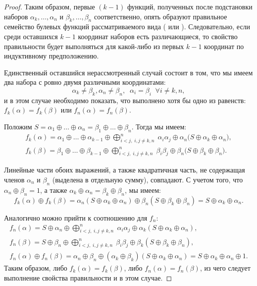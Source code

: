 \begin{proof}
        Таким образом, первые $(k-1)$ функций, полученных после подстановки наборов $\alpha_k, \ldots, \alpha_n$ и $\beta_k, \ldots, \beta_n$ соответственно, опять образуют правильное семейство булевых функций рассматриваемого вида ( или ).
        Следовательно, если среди оставшихся $k-1$ координат наборов есть различающиеся, то свойство правильности будет выполняться для какой-либо из первых $k-1$ координат по индуктивному предположению.

        Единственный оставшийся нерассмотренный случай состоит в том, что мы имеем два набора с ровно двумя различными координатами:
        \[
            \alpha_k \ne \beta_k, \alpha_n \ne \beta_n, \; \; \alpha_i = \beta_i \; \; \forall i \ne k, n,
        \]
        и в этом случае необходимо показать, что выполнено хотя бы одно из равенств: 
        $f_k(\alpha) = f_k(\beta)$ или $f_n(\alpha) = f_n(\beta)$. 


        Положим $S = \alpha_1 \oplus \ldots \oplus \alpha_{n} = \beta_1 \oplus \ldots \oplus \beta_{n}$.
        Тогда мы имеем:
        \begin{gather*}
            f_k(\alpha) = \alpha_1 \oplus \ldots \oplus \alpha_{k-1}
            \oplus \bigoplus_{i < j, \; i, j \ne k, n}^n \; \alpha_i \alpha_j
            \oplus \alpha_n \Big(S \oplus \alpha_k \oplus \alpha_n \Big), \\
            f_k(\beta) = \beta_1 \oplus \ldots \oplus \beta_{k-1}
            \oplus \bigoplus_{i < j, \; i, j \ne k, n}^n \; \beta_i \beta_j
            \oplus \beta_n \Big(S \oplus \beta_k \oplus \beta_n \Big).
        \end{gather*}

        Линейные части обоих выражений, а также квадратичная часть, не содержащая членов $\alpha_n$ и $\beta_n$ (выделена в отдельную сумму), совпадают.
        С учетом того, что $\alpha_n \oplus \beta_n = 1$, а также $ \alpha_k \oplus \alpha_n = \beta_k \oplus \beta_n $, 
        мы имеем: 
        \[
            f_k(\alpha) \oplus f_k(\beta) = 
            \alpha_n (S \oplus \alpha_k \oplus \alpha_n) \oplus
            \beta_n(S \oplus \beta_k \oplus \beta_n)  = S \oplus \alpha_k \oplus \alpha_n.
        \]

        Аналогично можно прийти к соотношению для $f_n$:
        \begin{gather*}
            f_n(\alpha) = S \oplus \alpha_n \oplus \bigoplus_{i < j, \; i, j \ne k, n}^n \; \alpha_i \alpha_j \oplus \alpha_k (S \oplus \alpha_k \oplus \alpha_n), \\
            f_n(\beta) = S \oplus \beta_n \oplus \bigoplus_{i < j, \; i, j \ne k, n}^n \; \beta_i \beta_j \oplus \beta_k (S \oplus \beta_k \oplus \beta_n), \\
            f_n(\alpha) \oplus f_n(\beta) = \alpha_n \oplus \beta_n \oplus (\alpha_k \oplus \beta_k) (S \oplus \alpha_k \oplus \alpha_n) = S \oplus \alpha_k \oplus \alpha_n \oplus 1.
        \end{gather*}
        Таким образом, либо $f_k(\alpha) = f_k(\beta)$, либо $f_n(\alpha) = f_n(\beta)$, из чего следует выполнение свойства правильности и в этом случае.
    \end{proof}

